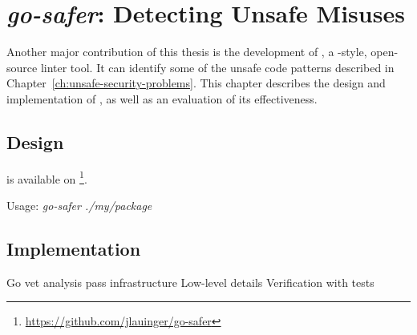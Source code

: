 
\chapter{\textit{go-safer}: Detecting Unsafe Misuses}\label{ch:go-safer}

Another major contribution of this thesis is the development of \toolSafer{}, a \toolVet{}-style, open-source linter
tool.
It can identify some of the unsafe code patterns described in Chapter~\ref{ch:unsafe-security-problems}.
This chapter describes the design and implementation of \toolSafer{}, as well as an evaluation of its effectiveness.





\section{Design}\label{sec:go-safer:design}

\toolSafer{} is available on \github{}\footnote{\url{https://github.com/jlauinger/go-safer}}.







Usage: \textit{go-safer ./my/package}





\section{Implementation}\label{sec:go-safer:implementation}

Go vet analysis pass infrastructure
Low-level details
Verification with tests




